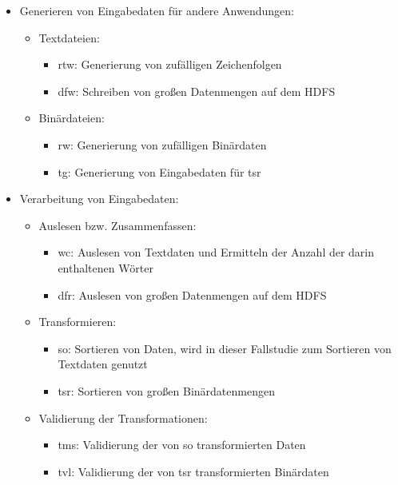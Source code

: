 \begin{itemize}
    \item Generieren von Eingabedaten für andere Anwendungen:
    \begin{itemize}
        \item Textdateien:
        \begin{itemize}
            \item \gls{rtw}: Generierung von zufälligen Zeichenfolgen
            \item \gls{dfw}: Schreiben von großen Datenmengen auf dem HDFS
        \end{itemize}
        \item Binärdateien:
        \begin{itemize}
            \item \gls{rw}: Generierung von zufälligen Binärdaten
            \item \gls{tg}: Generierung von Eingabedaten für \acrlong{tsr}
       \end{itemize}
    \end{itemize}

    \item Verarbeitung von Eingabedaten:
    \begin{itemize}
        \item Auslesen bzw. Zusammenfassen:
        \begin{itemize}
            \item \gls{wc}: Auslesen von Textdaten und Ermitteln der Anzahl der darin enthaltenen Wörter
            \item \gls{dfr}: Auslesen von großen Datenmengen auf dem HDFS
        \end{itemize}
        \item Transformieren:
        \begin{itemize}
            \item \gls{so}: Sortieren von Daten, wird in dieser Fallstudie zum Sortieren von Textdaten genutzt
            \item \gls{tsr}: Sortieren von großen Binärdatenmengen
        \end{itemize}
        \item Validierung der Transformationen:
        \begin{itemize}
            \item \gls{tms}: Validierung der von \acrlong{so} transformierten Daten
            \item \gls{tvl}: Validierung der von \acrlong{tsr} transformierten Binärdaten
        \end{itemize}
    \end{itemize}


\end{itemize}
